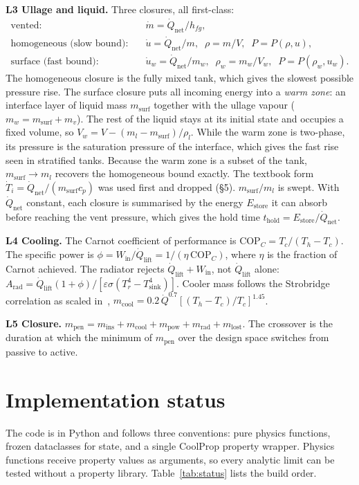 \documentclass[11pt]{article}
\newcommand{\Qd}{\dot Q}
\newcommand{\md}{\dot m}
\begin{document}
\textbf{L3 Ullage and liquid.} Three closures, all first-class:
\begin{align}
\text{vented:}\quad & \md=\Qd_\text{net}/h_{fg},\\
\text{homogeneous (slow bound):}\quad & \dot u=\Qd_\text{net}/m,\;\; \rho=m/V,\;\; P=P(\rho,u),\\
\text{surface (fast bound):}\quad & \dot u_w=\Qd_\text{net}/m_w,\;\; \rho_w=m_w/V_w,\;\; P=P(\rho_w,u_w).
\end{align}
The homogeneous closure is the fully mixed tank, which gives the slowest possible pressure rise. The surface
closure puts all incoming energy into a \emph{warm zone}: an interface layer of liquid mass $m_\text{surf}$
together with the ullage vapour ($m_w=m_\text{surf}+m_v$). The rest of the liquid stays at its initial state
and occupies a fixed volume, so $V_w=V-(m_l-m_\text{surf})/\rho_l$. While the warm zone is two-phase, its
pressure is the saturation pressure of the interface, which gives the fast rise seen in stratified tanks.
Because the warm zone is a subset of the tank, $m_\text{surf}\to m_l$ recovers the homogeneous bound exactly.
The textbook form $\dot T_i=\Qd_\text{net}/(m_\text{surf}c_p)$ was used first and dropped (\S5).
$m_\text{surf}/m_l$ is swept. With $\Qd_\text{net}$ constant, each closure is summarised by the energy $E_\text{store}$ it can absorb
before reaching the vent pressure, which gives the hold time $t_\text{hold}=E_\text{store}/\Qd_\text{net}$.

\textbf{L4 Cooling.} The Carnot coefficient of performance is $\text{COP}_C=T_c/(T_h-T_c)$. The specific
power is $\phi=W_\text{in}/\Qd_\text{lift}=1/(\eta\,\text{COP}_C)$, where $\eta$ is the fraction of Carnot
achieved. The radiator rejects $\Qd_\text{lift}+W_\text{in}$, not $\Qd_\text{lift}$ alone:
$A_\text{rad}=\Qd_\text{lift}(1+\phi)/[\varepsilon\sigma(T_r^4-T_\text{sink}^4)]$. Cooler mass follows the
Strobridge correlation as scaled in~\cite{plachta2003},
$m_\text{cool}=0.2\,\Qd^{0.7}[(T_h-T_c)/T_c]^{1.45}$.

\textbf{L5 Closure.} $m_\text{pen}=m_\text{ins}+m_\text{cool}+m_\text{pow}+m_\text{rad}+m_\text{lost}$.
The crossover is the duration at which the minimum of $m_\text{pen}$ over the design space switches from
passive to active.

\section{Implementation status}
The code is in Python and follows three conventions: pure physics functions, frozen dataclasses for state,
and a single CoolProp property wrapper. Physics functions receive property values as arguments, so every
analytic limit can be tested without a property library. Table~\ref{tab:status} lists the build order.
\end{document}
